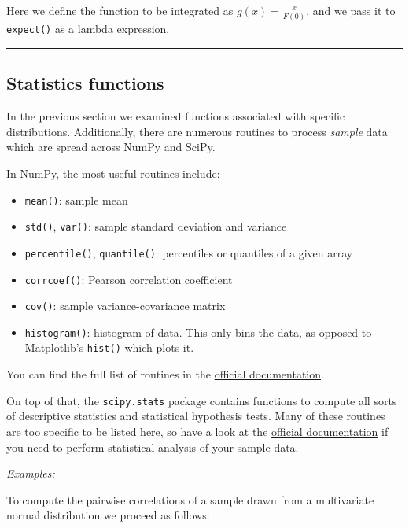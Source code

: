 \documentclass[10pt]{scrartcl}
\providecommand{\tightlist}{%
      \setlength{\itemsep}{0pt}\setlength{\parskip}{0pt}}
\begin{document}
    Here we define the function to be integrated as
\(g(x) = \frac{x}{F(0)}\), and we pass it to \texttt{expect()} as a
lambda expression.

    \begin{center}\rule{0.5\linewidth}{0.5pt}\end{center}

\hypertarget{statistics-functions}{%
\subsection{Statistics functions}\label{statistics-functions}}

In the previous section we examined functions associated with specific
distributions. Additionally, there are numerous routines to process
\emph{sample} data which are spread across NumPy and SciPy.

In NumPy, the most useful routines include:

\begin{itemize}
\tightlist
\item
  \texttt{mean()}: sample mean
\item
  \texttt{std()}, \texttt{var()}: sample standard deviation and variance
\item
  \texttt{percentile()}, \texttt{quantile()}: percentiles or quantiles
  of a given array
\item
  \texttt{corrcoef()}: Pearson correlation coefficient
\item
  \texttt{cov()}: sample variance-covariance matrix
\item
  \texttt{histogram()}: histogram of data. This only bins the data, as
  opposed to Matplotlib's \texttt{hist()} which plots it.
\end{itemize}

You can find the full list of routines in the
\href{https://numpy.org/doc/stable/reference/routines.statistics.html}{official
documentation}.

On top of that, the \texttt{scipy.stats} package contains functions to
compute all sorts of descriptive statistics and statistical hypothesis
tests. Many of these routines are too specific to be listed here, so
have a look at the
\href{https://docs.scipy.org/doc/scipy/reference/stats.html\#summary-statistics}{official
documentation} if you need to perform statistical analysis of your
sample data.

\emph{Examples:}

To compute the pairwise correlations of a sample drawn from a
multivariate normal distribution we proceed as follows:
\end{document}
